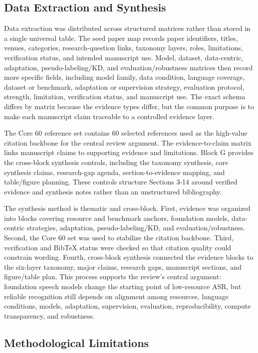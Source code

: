 \documentclass[pdflatex,sn-basic]{sn-jnl}
\theoremstyle{thmstyleone}
\theoremstyle{thmstyletwo}
\theoremstyle{thmstylethree}
\begin{document}
\subsection{Data Extraction and Synthesis}

Data extraction was distributed across structured matrices rather than stored in a single universal table. The seed paper map records paper identifiers, titles, venues, categories, research-question links, taxonomy layers, roles, limitations, verification status, and intended manuscript use. Model, dataset, data-centric, adaptation, pseudo-labeling/KD, and evaluation/robustness matrices then record more specific fields, including model family, data condition, language coverage, dataset or benchmark, adaptation or supervision strategy, evaluation protocol, strength, limitation, verification status, and manuscript use. The exact schema differs by matrix because the evidence types differ, but the common purpose is to make each manuscript claim traceable to a controlled evidence layer.

The Core 60 reference set contains 60 selected references used as the high-value citation backbone for the central review argument. The evidence-to-claim matrix links manuscript claims to supporting evidence and limitations. Block G provides the cross-block synthesis controls, including the taxonomy synthesis, core synthesis claims, research-gap agenda, section-to-evidence mapping, and table/figure planning. These controls structure Sections 3-14 around verified evidence and synthesis notes rather than an unstructured bibliography.

The synthesis method is thematic and cross-block. First, evidence was organized into blocks covering resource and benchmark anchors, foundation models, data-centric strategies, adaptation, pseudo-labeling/KD, and evaluation/robustness. Second, the Core 60 set was used to stabilize the citation backbone. Third, verification and BibTeX status were checked so that citation quality could constrain wording. Fourth, cross-block synthesis connected the evidence blocks to the six-layer taxonomy, major claims, research gaps, manuscript sections, and figure/table plan. This process supports the review's central argument: foundation speech models change the starting point of low-resource ASR, but reliable recognition still depends on alignment among resources, language conditions, models, adaptation, supervision, evaluation, reproducibility, compute transparency, and robustness.

\subsection{Methodological Limitations}
\end{document}

